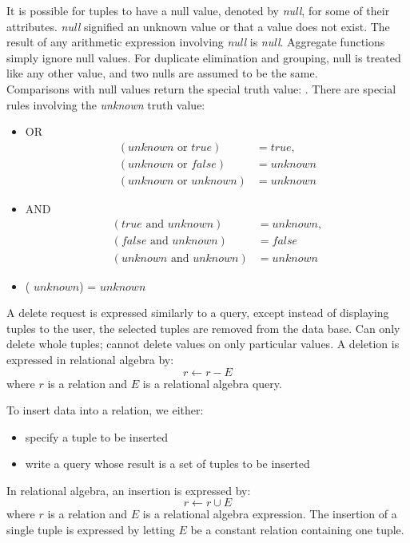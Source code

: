 \documentclass{article}
\begin{document}
It is possible for tuples to have a null value, denoted by \emph{null}, for some of their attributes. \emph{null} signified an unknown value or that a value does not exist. The result of any arithmetic expression involving \emph{null} is \emph{null}. Aggregate functions simply ignore null values. For duplicate elimination and grouping, null is treated like any other value, and two nulls are assumed to be the same. \\ 

Comparisons with null values return the special truth value: . There are special rules involving the \emph{unknown} truth value:
\begin{itemize}
  \item OR \\
    \begin{align*}
      (unknown \textrm{ or } true) &= true, \\ 
      (unknown \textrm{ or } false) &= unknown \\ 
      (unknown \textrm{ or } unknown) &= unknown
    \end{align*}
  \item AND 
    \begin{align*}
      (true \textrm{ and } unknown) &= unknown, \\ 
      (false \textrm{ and } unknown) &= false \\ 
      (unknown \textrm{ and } unknown) &= unknown 
    \end{align*}
  \item ( $unknown$) = $unknown$
\end{itemize}

\begin{definition}[Deletion]
  A delete request is expressed similarly to a query, except instead of displaying tuples to the user, the selected tuples are removed from the data base. Can only delete whole tuples; cannot delete values on only particular values. A deletion is expressed in relational algebra by: $$r \leftarrow r - E$$ where $r$ is a relation and $E$ is a relational algebra query. 
\end{definition}

\begin{definition}[Insertion]
  To insert data into a relation, we either: 
  \begin{itemize}
    \item specify a tuple to be inserted 
    \item write a query whose result is a set of tuples to be inserted 
  \end{itemize}
  In relational algebra, an insertion is expressed by: $$r \leftarrow r \cup E$$ where $r$ is a relation and $E$ is a relational algebra expression. The insertion of a single tuple is expressed by letting $E$ be a constant relation containing one tuple. 
\end{definition}
\end{document}
